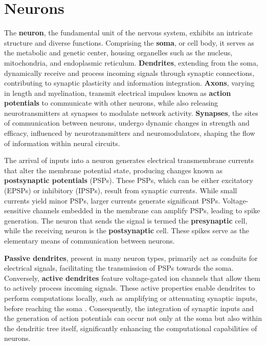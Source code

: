 \documentclass[../main.tex]{subfiles}
\begin{document}
\section{Neurons}
The \textbf{neuron}, the fundamental unit of the nervous system, exhibits an intricate structure and diverse functions.
Comprising the \textbf{soma}, or cell body, it serves as the metabolic and genetic center, housing organelles such as the nucleus, mitochondria, and endoplasmic reticulum.
\textbf{Dendrites}, extending from the soma, dynamically receive and process incoming signals through synaptic connections, contributing to synaptic plasticity and information integration.
\textbf{Axons}, varying in length and myelination, transmit electrical impulses known as \textbf{action potentials} to communicate with other neurons, while also releasing neurotransmitters at synapses to modulate network activity.
\textbf{Synapses}, the sites of communication between neurons, undergo dynamic changes in strength and efficacy, influenced by neurotransmitters and neuromodulators, shaping the flow of information within neural circuits.

The arrival of inputs into a neuron generates electrical transmembrane currents that alter the membrane potential state, producing changes known as \textbf{postsynaptic potentials} (PSPs).
These PSPs, which can be either excitatory (EPSPs) or inhibitory (IPSPs), result from synaptic currents. While small currents yield minor PSPs, larger currents generate significant PSPs.
Voltage-sensitive channels embedded in the membrane can amplify PSPs, leading to spike generation.
The neuron that sends the signal is termed the \textbf{presynaptic} cell, while the receiving neuron is the \textbf{postsynaptic} cell.
These spikes serve as the elementary means of communication between neurons.

\textbf{Passive dendrites}, present in many neuron types, primarily act as conduits for electrical signals, facilitating the transmission of PSPs towards the soma.
Conversely, \textbf{active dendrites} feature voltage-gated ion channels that allow them to actively process incoming signals.
These active properties enable dendrites to perform computations locally, such as amplifying or attenuating synaptic inputs, before reaching the soma \citep{stuart_dendritic_2015,tzilivaki_challenging_2019,poirazi_illuminating_2020}.
Consequently, the integration of synaptic inputs and the generation of action potentials can occur not only at the soma but also within the dendritic tree itself, significantly enhancing the computational capabilities of neurons.
\end{document}
